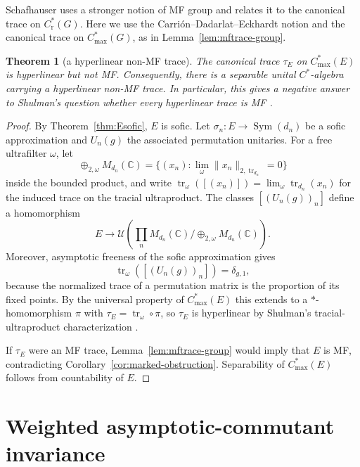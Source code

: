 \documentclass[11pt]{amsart}
\newcommand{\leanverified}[2]{\ignorespaces}
\theoremstyle{definition}
\theoremstyle{remark}
\theoremstyle{plain}
\newtheorem{mainthm}{Theorem}
\newcommand{\C}{\mathbb C}
\newcommand{\U}{\mathcal U}
\newcommand{\tr}{\operatorname{tr}}
\newcommand{\Cmax}{C^*_{\mathrm{max}}}
\newcommand{\Cred}{C^*_{\mathrm r}}
\begin{document}
\noindent
Schafhauser \cite[Definition~1.1 and Proposition~2.2]{Schafhauser}
uses a stronger notion of MF group and relates it to the canonical
trace on $\Cred(G)$.  Here we use the Carri\'on--Dadarlat--Eckhardt
notion and the canonical trace on $\Cmax(G)$, as in
Lemma~\ref{lem:mftrace-group}.

\begin{mainthm}[a hyperlinear non-MF trace]\label{thm:trace}
The canonical trace $\tau_E$ on $\Cmax(E)$ is hyperlinear but not
MF\@.  Consequently, there is a separable unital $C^*$-algebra carrying
a hyperlinear non-MF trace.  In particular, this gives a negative
answer to Shulman's question whether every hyperlinear trace is MF
\cite{ShulmanTraces}.
\leanverified{Sofic/TraceSeparationEndpoint}{GroupApproximation.manuscriptTraceSeparation}
\end{mainthm}

\begin{proof}
By Theorem~\ref{thm:Esofic}, $E$ is sofic.  Let
$\sigma_n\colon E\to\operatorname{Sym}(d_n)$ be a sofic approximation
and $U_n(g)$ the associated permutation unitaries.  For a free
ultrafilter $\omega$, let
\[
 \oplus_{2,\omega}M_{d_n}(\C)
 =\bigl\{(x_n):\lim_\omega\lVert x_n\rVert_{2,\tr_{d_n}}=0\bigr\}
\]
inside the bounded product, and write
$\operatorname{tr}_\omega([(x_n)])=\lim_\omega\tr_{d_n}(x_n)$ for the
induced trace on the tracial ultraproduct.  The classes
$[(U_n(g))_n]$ define a homomorphism
\[
E\longrightarrow
\U\!\left(\prod_n M_{d_n}(\C)\big/\oplus_{2,\omega}M_{d_n}(\C)\right).
\]
Moreover, asymptotic freeness of the sofic approximation gives
\[
\operatorname{tr}_\omega([(U_n(g))_n])=\delta_{g,1},
\]
because the normalized trace of a permutation matrix is the proportion
of its fixed points.  By the universal property of $\Cmax(E)$ this
extends to a $*$-homomorphism $\pi$ with
$\tau_E=\operatorname{tr}_\omega\circ\pi$, so $\tau_E$ is hyperlinear
by Shulman's tracial-ultraproduct characterization
\cite{ShulmanTraces}.

If $\tau_E$ were an MF trace, Lemma~\ref{lem:mftrace-group} would imply
that $E$ is MF, contradicting Corollary~\ref{cor:marked-obstruction}\@.  Separability of
$\Cmax(E)$ follows from countability of $E$.
\end{proof}

\section{Weighted asymptotic-commutant invariance}\label{supp:transport-variants}
\end{document}
